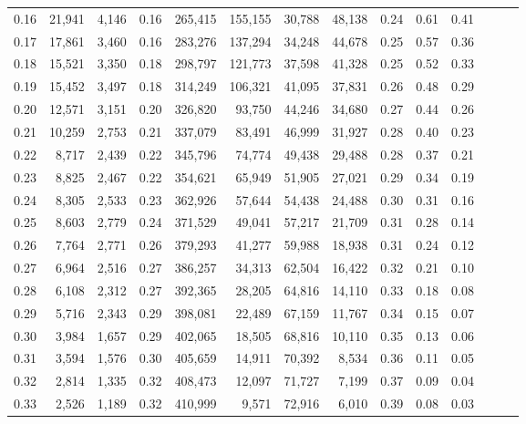 \begin{tabular}{rrrrrrrrrrrrrr}
0.16 &  21,941 &  4,146 &  0.16 &  265,415 &  155,155 &  30,788 &  48,138 &  0.24 &  0.61 &      0.41 \\
0.17 &  17,861 &  3,460 &  0.16 &  283,276 &  137,294 &  34,248 &  44,678 &  0.25 &  0.57 &      0.36 \\
0.18 &  15,521 &  3,350 &  0.18 &  298,797 &  121,773 &  37,598 &  41,328 &  0.25 &  0.52 &      0.33 \\
0.19 &  15,452 &  3,497 &  0.18 &  314,249 &  106,321 &  41,095 &  37,831 &  0.26 &  0.48 &      0.29 \\
0.20 &  12,571 &  3,151 &  0.20 &  326,820 &   93,750 &  44,246 &  34,680 &  0.27 &  0.44 &      0.26 \\
0.21 &  10,259 &  2,753 &  0.21 &  337,079 &   83,491 &  46,999 &  31,927 &  0.28 &  0.40 &      0.23 \\
0.22 &   8,717 &  2,439 &  0.22 &  345,796 &   74,774 &  49,438 &  29,488 &  0.28 &  0.37 &      0.21 \\
0.23 &   8,825 &  2,467 &  0.22 &  354,621 &   65,949 &  51,905 &  27,021 &  0.29 &  0.34 &      0.19 \\
0.24 &   8,305 &  2,533 &  0.23 &  362,926 &   57,644 &  54,438 &  24,488 &  0.30 &  0.31 &      0.16 \\
0.25 &   8,603 &  2,779 &  0.24 &  371,529 &   49,041 &  57,217 &  21,709 &  0.31 &  0.28 &      0.14 \\
0.26 &   7,764 &  2,771 &  0.26 &  379,293 &   41,277 &  59,988 &  18,938 &  0.31 &  0.24 &      0.12 \\
0.27 &   6,964 &  2,516 &  0.27 &  386,257 &   34,313 &  62,504 &  16,422 &  0.32 &  0.21 &      0.10 \\
0.28 &   6,108 &  2,312 &  0.27 &  392,365 &   28,205 &  64,816 &  14,110 &  0.33 &  0.18 &      0.08 \\
0.29 &   5,716 &  2,343 &  0.29 &  398,081 &   22,489 &  67,159 &  11,767 &  0.34 &  0.15 &      0.07 \\
0.30 &   3,984 &  1,657 &  0.29 &  402,065 &   18,505 &  68,816 &  10,110 &  0.35 &  0.13 &      0.06 \\
0.31 &   3,594 &  1,576 &  0.30 &  405,659 &   14,911 &  70,392 &   8,534 &  0.36 &  0.11 &      0.05 \\
0.32 &   2,814 &  1,335 &  0.32 &  408,473 &   12,097 &  71,727 &   7,199 &  0.37 &  0.09 &      0.04 \\
0.33 &   2,526 &  1,189 &  0.32 &  410,999 &    9,571 &  72,916 &   6,010 &  0.39 &  0.08 &      0.03 \\

\end{tabular}
